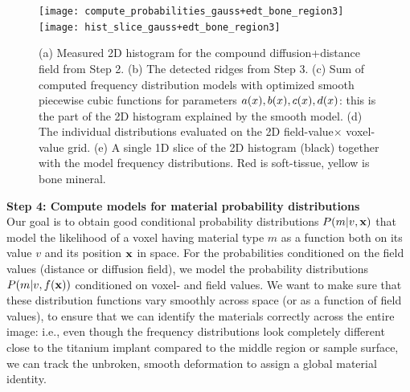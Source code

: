 \documentclass[pdflatex,sn-mathphys]{sn-jnl}%
\theoremstyle{thmstyleone}%
\theoremstyle{thmstyletwo}%
\theoremstyle{thmstylethree}%
\begin{document}
\begin{figure}
  \centering
  \texttt{[image: compute\_probabilities\_gauss+edt\_bone\_region3]}\\
  \texttt{[image: hist\_slice\_gauss+edt\_bone\_region3]}\\
  \caption{(a) Measured 2D histogram for the compound diffusion+distance field from Step 2. (b)
    The detected ridges from Step 3. (c) Sum of computed frequency distribution models
    with optimized smooth piecewise cubic functions for parameters $a(x), b(x), c(x), d(x)$:
    this is the part of the 2D histogram explained by the smooth model. (d) The individual distributions evaluated
    on the 2D field-value$\times$ voxel-value grid. (e) A single 1D slice of the 2D histogram (black) together with
    the model frequency distributions. Red is soft-tissue, yellow is bone mineral.
  }
  \label{fig:curves-and-more}
\end{figure}

\vspace{\baselineskip}
\noindent\textbf{Step 4: Compute models for material probability distributions} \\
Our goal is to obtain good conditional probability distributions $P\!\left(m\middle\vert v,\mathbf{x}\right)$
that model the likelihood of a voxel having material type $m$ as a function
both on its value $v$ and its position $\mathbf{x}$ in space. For the probabilities
conditioned on the field values (distance or diffusion field), we model
the probability distributions $P\!\left(m\middle\vert v,f(\mathbf{x})\right)$ conditioned on
voxel- and field values. We want to make sure that these distribution
functions vary smoothly across space (or as a function of field values),
to ensure that we can identify the materials correctly across the entire
image: i.e., even though the frequency distributions look completely different
close to the titanium implant compared to the middle region or sample surface,
we can track the unbroken, smooth deformation to assign a global material
identity.
\end{document}
